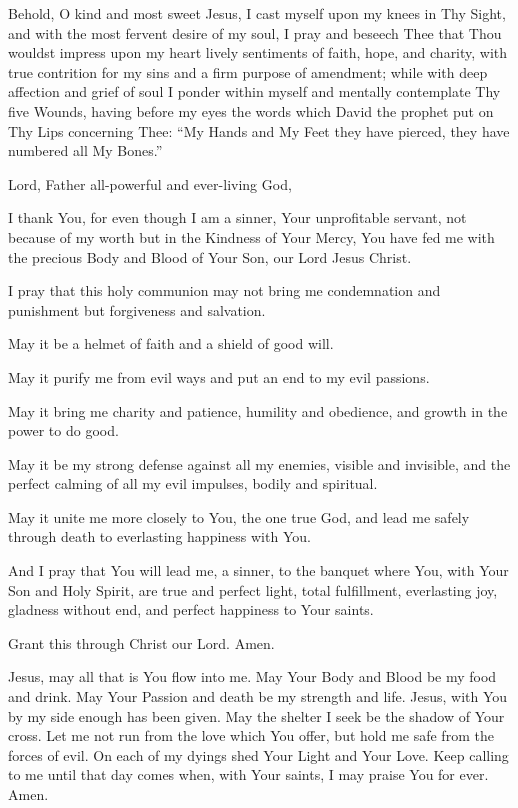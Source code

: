 Behold, O kind and most sweet Jesus, I cast myself upon my knees in Thy Sight, and with the most fervent desire of my soul, I pray and beseech Thee that Thou wouldst impress upon my heart lively sentiments of faith, hope, and charity, with true contrition for my sins and a firm purpose of amendment;
while with deep affection and grief of soul I ponder within myself and mentally contemplate Thy five Wounds, having before my eyes the words which David the prophet put on Thy Lips concerning Thee:
``My Hands and My Feet they have pierced, they have numbered all My Bones.''

Lord, Father all-powerful and ever-living God,

I thank You, for even though I am a sinner, Your unprofitable servant, not because of my worth but in the Kindness of Your Mercy, You have fed me with the precious Body and Blood of Your Son, our Lord Jesus Christ.

I pray that this holy communion may not bring me condemnation and punishment but forgiveness and salvation.

May it be a helmet of faith and a shield of good will.

May it purify me from evil ways and put an end to my evil passions.

May it bring me charity and patience, humility and obedience, and growth in the power to do good.

May it be my strong defense against all my enemies, visible and invisible, and the perfect calming of all my evil impulses, bodily and spiritual.

May it unite me more closely to You, the one true God, and lead me safely through death to everlasting happiness with You.

And I pray that You will lead me, a sinner, to the banquet where You, with Your Son and Holy Spirit, are true and perfect light, total fulfillment, everlasting joy, gladness without end, and perfect happiness to Your saints.

Grant this through Christ our Lord. Amen.

Jesus, may all that is You flow into me.
May Your Body and Blood be my food and drink.
May Your Passion and death be my strength and life.
Jesus, with You by my side enough has been given.
May the shelter I seek be the shadow of Your cross.
Let me not run from the love which You offer, but hold me safe from the forces of evil.
On each of my dyings shed Your Light and Your Love.
Keep calling to me until that day comes when, with Your saints, I may praise You for ever.
Amen.

